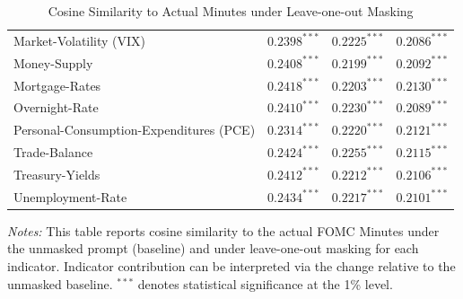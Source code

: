 \begin{table}[htbp]
\begin{threeparttable}
\begin{tabular}{p{3.6cm} p{4.3cm} p{3.1cm} p{3.1cm}}
Market-Volatility (VIX) & $0.2398^{***}$ & $0.2225^{***}$ & $0.2086^{***}$ \\
Money-Supply & $0.2408^{***}$ & $0.2199^{***}$ & $0.2092^{***}$ \\
Mortgage-Rates & $0.2418^{***}$ & $0.2203^{***}$ & $0.2130^{***}$ \\
Overnight-Rate & $0.2410^{***}$ & $0.2230^{***}$ & $0.2089^{***}$ \\
Personal-Consumption-Expenditures (PCE) & $0.2314^{***}$ & $0.2220^{***}$ & $0.2121^{***}$ \\
Trade-Balance & $0.2424^{***}$ & $0.2255^{***}$ & $0.2115^{***}$ \\
Treasury-Yields & $0.2412^{***}$ & $0.2212^{***}$ & $0.2106^{***}$ \\
Unemployment-Rate & $0.2434^{***}$ & $0.2217^{***}$ & $0.2101^{***}$ \\
\bottomrule
\end{tabular}
\begin{tablenotes}[flushleft]
\footnotesize
\item \textit{Notes:} This table reports cosine similarity to the actual FOMC Minutes under the unmasked prompt (baseline) and under leave-one-out masking for each indicator. Indicator contribution can be interpreted via the change relative to the unmasked baseline. 
$^{***}$ denotes statistical significance at the 1\% level.
\end{tablenotes}
\caption{Cosine Similarity to Actual Minutes under Leave-one-out Masking}
\label{tab:ch2:shapley_by_raw_result}
\end{threeparttable}
\end{table}


